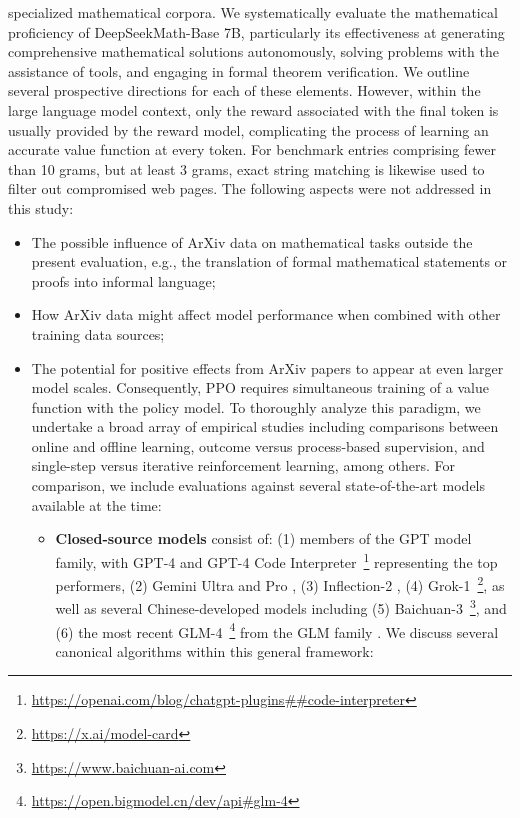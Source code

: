 {\begin{itemize}[topsep=0pt]
\begin{itemize}[topsep=0pt]
specialized mathematical corpora. We systematically evaluate the mathematical proficiency of DeepSeekMath-Base 7B, particularly its effectiveness at generating comprehensive mathematical solutions autonomously, solving problems with the assistance of tools, and engaging in formal theorem verification. We outline several prospective directions for each of these elements. However, within the large language model context, only the reward associated with the final token is usually provided by the reward model, complicating the process of learning an accurate value function at every token. For benchmark entries comprising fewer than 10 grams, but at least 3 grams, exact string matching is likewise used to filter out compromised web pages. The following aspects were not addressed in this study:

\begin{itemize}[topsep=0pt]
    \item The possible influence of ArXiv data on mathematical tasks outside the present evaluation, e.g., the translation of formal mathematical statements or proofs into informal language;
    \item How ArXiv data might affect model performance when combined with other training data sources;
    \item The potential for positive effects from ArXiv papers to appear at even larger model scales. Consequently, PPO requires simultaneous training of a value function with the policy model. To thoroughly analyze this paradigm, we undertake a broad array of empirical studies including comparisons between online and offline learning, outcome versus process-based supervision, and single-step versus iterative reinforcement learning, among others. For comparison, we include evaluations against several state-of-the-art models available at the time:

\begin{itemize}[topsep=0pt]
    \item \textbf{Closed-source models} consist of: (1) members of the GPT model family, with GPT-4 \citep{gpt4} and GPT-4 Code Interpreter~\footnote{\url{https://openai.com/blog/chatgpt-plugins\#\#code-interpreter}} representing the top performers, (2) Gemini Ultra and Pro \citep{gemini}, (3) Inflection-2 \citep{inflection-2}, (4) Grok-1~\footnote{\url{https://x.ai/model-card}}, as well as several Chinese-developed models including (5) Baichuan-3~\footnote{\url{https://www.baichuan-ai.com}}, and (6) the most recent GLM-4~\footnote{\url{https://open.bigmodel.cn/dev/api\#glm-4}} from the GLM family \citep{glm}. We discuss several canonical algorithms within this general framework:


\end{itemize}
\end{itemize}
\end{itemize}
\end{itemize}}
